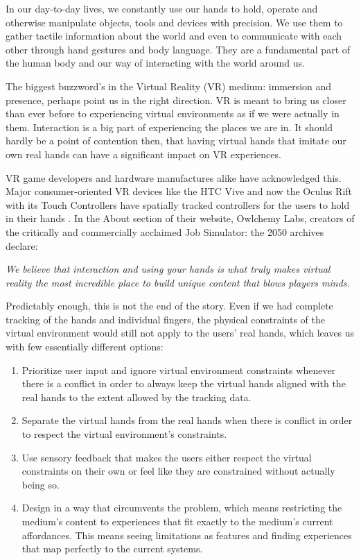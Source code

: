 In our day-to-day lives, we constantly use our hands to hold, operate and otherwise manipulate objects, tools and devices with precision. We use them to gather tactile information about the world and even to communicate with each other through hand gestures and body language. They are a fundamental part of the human body and our way of interacting with the world around us.

The biggest buzzword's in the Virtual Reality (VR) medium: immersion and presence, perhaps point us in the right direction. VR is meant to bring us closer than ever before to experiencing virtual environments as if we were actually in them. Interaction is a big part of experiencing the places we are in. It should hardly be a point of contention then, that having virtual hands that imitate our own real hands can have a significant impact on VR experiences.

VR game developers and hardware manufactures alike have acknowledged this. Major consumer-oriented VR devices like the HTC Vive and now the Oculus Rift with its Touch Controllers have spatially tracked controllers for the users to hold in their hands \parencite{htcvive2016, oculus2016}. In the About section of their website, Owlchemy Labs, creators of the critically and commercially acclaimed \parencite{UnityAwards2016, SteamSpyJobSim} Job Simulator: the 2050 archives \parencite{OwlchemyLabs2016} declare:

\begin{displayquote}
\textit{We believe that interaction and using your hands is what truly makes virtual reality the most incredible place to build unique content that blows players minds.} \parencite{aboutOwlchemyLabs}
\end{displayquote}

Predictably enough, this is not the end of the story. Even if we had complete tracking of the hands and individual fingers, the physical constraints of the virtual environment would still not apply to the users' real hands, which leaves us with few essentially different options:

\begin{enumerate}
\item Prioritize user input and ignore virtual environment constraints whenever there is a conflict in order to always keep the virtual hands aligned with the real hands to the extent allowed by the tracking data.
\item Separate the virtual hands from the real hands when there is conflict in order to respect the virtual environment's constraints.
\item Use sensory feedback that makes the users either respect the virtual constraints on their own or feel like they are constrained without actually being so.
\item Design in a way that circumvents the problem, which means restricting the medium's content to experiences that fit exactly to the medium's current affordances. This means seeing limitations as features and finding experiences that map perfectly to the current systems.
\end{enumerate}

